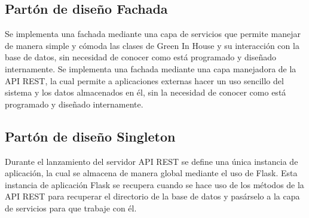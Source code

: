     \subsection{Partón de diseño Fachada}
        Se implementa una fachada mediante una capa de servicios que permite manejar de manera simple y cómoda las clases de Green In House y su interacción con la base de datos, sin necesidad de conocer como está programado y diseñado internamente.
        Se implementa una fachada mediante una capa manejadora de la API REST, la cual permite a aplicaciones externas hacer un uso sencillo del sistema y los datos almacenados en él, sin la necesidad de conocer como está programado y diseñado internamente.
    \subsection{Partón de diseño Singleton}
        Durante el lanzamiento del servidor API REST se define una única instancia de aplicación, la cual se almacena de manera global mediante el uso de Flask. Esta instancia de aplicación Flask se recupera cuando se hace uso de los métodos de la API REST para recuperar el directorio de la base de datos y pasárselo a la capa de servicios para que trabaje con él.
